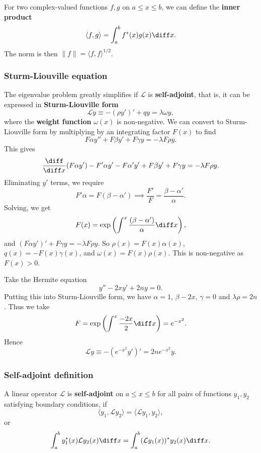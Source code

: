 \documentclass[12pt]{article}
\begin{document}
For two complex-valued functions $f, g$ on $a \leq x \leq b$, we can define the \textbf{inner product}
\[
	\langle f, g \rangle = \int_{a}^{b} f^{\ast}(x) g(x)\diff x
.\]
The norm is then $\|f\| = \langle f, f \rangle^{1/2}$.

\subsubsection{Sturm-Liouville equation}%
\label{subsub:sturm_liouville_equation}

The eigenvalue problem greatly simplifies if $\mathcal{L}$ is \textbf{self-adjoint}, that is, it can be expressed in \textbf{Sturm-Liouville form}
\[
	\mathcal{L} y \equiv - (\rho y')' + q y = \lambda \omega y
,\]
where the \textbf{weight function} $\omega(x)$ is non-negative. We can convert to Sturm-Liouville form by multiplying by an integrating factor $F(x)$ to find
\[
F \alpha y'' + F \beta y' + F \gamma y = - \lambda F \rho y
.\]
This gives
\[
	\frac{\diff}{\diff x} (F \alpha y') - F' \alpha y' - F \alpha' y' + F \beta y' + F \gamma y = - \lambda F \rho y
.\]
Eliminating $y'$ terms, we require
\[
	F' \alpha = F(\beta - \alpha') \implies \frac{F'}{F} = \frac{\beta - \alpha'}{\alpha}
.\]
Solving, we get
\[
	F(x) = \exp \left( \int^{x} \frac{(\beta - \alpha')}{\alpha} \diff x \right)
,\]
and $(F \alpha y')' + F \gamma y = - \lambda F \rho y$. So $\rho(x) = F(x) \alpha (x)$, $q(x) = - F(x) \gamma(x)$, and $\omega(x) = F(x) \rho(x)$. This is non-negative as $F(x) > 0$.

\begin{exbox}
	Take the Hermite equation
	\[
	y'' - 2xy' + 2n y = 0
	.\]
	Putting this into Sturm-Liouville form, we have $\alpha = 1$, $\beta - 2x$, $\gamma = 0$ and $\lambda \rho = 2n$. Thus we take
	\[
		F = \exp \left( \int^{x} \frac{-2x}{2} \diff x \right) = e^{-x^2}
	.\]
	Hence
	\[
		\mathcal{L} y \equiv -(e^{-x^2} y')' = 2n e^{-x^2}y
	.\]
\end{exbox}

\subsubsection{Self-adjoint definition}%
\label{subsub:self_adjoint_definition}

A linear operator $\mathcal{L}$ is \textbf{self-adjoint} on $a \leq x \leq b$ for all pairs of functions $y_1, y_2$ satisfying boundary conditions, if
\[
	\langle y_1, \mathcal{L}y_2 \rangle = \langle \mathcal{L}y_1, y_2 \rangle
,\]
or
\[
	\int_{a}^{b} y^{\ast}_1(x) \mathcal{L}y_2(x)\diff x = \int_{a}^{b} (\mathcal{L}y_1(x))^{\ast} y_2(x) \diff x
.\]
\end{document}
